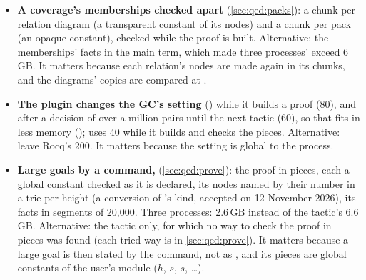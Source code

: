 \begin{itemize}
  whose applications cost the kernel time quadratic in their number. It
  matters because it is a conversion on the certificate's data.
\item \textbf{A coverage's memberships checked apart}
  (\cref{sec:qed:packs}): a chunk per relation diagram (a transparent
  constant of its nodes) and a chunk per pack (an opaque constant),
  checked while the proof is built. Alternative: the memberships' facts
  in the main term, which made three processes'  exceed
  6\,GB. It matters because each relation's nodes are made again in its
  chunks, and the diagrams' copies are compared at .
\item \textbf{The plugin changes the GC's setting} ()
  while it builds a proof (80), and after a decision of over a million
  pairs until the next tactic (60), so that  fits in less
  memory ();  uses 40 while
  it builds and checks the pieces. Alternative: leave Rocq's 200. It
  matters because the setting is global to the process.
\item \textbf{Large goals by a command, }
  (\cref{sec:qed:prove}): the proof in pieces, each a global constant
  checked as it is declared, its nodes named by their number in a trie
  per height (a conversion of 's kind, accepted on 12 November
  2026), its facts in segments of 20,000. Three processes: 2.6\,GB
  instead of the tactic's 6.6\,GB. Alternative: the tactic only, for
  which no way to check the proof in pieces was found (each tried way
  is in \cref{sec:qed:prove}). It matters because a large goal is then
  stated by the command, not as , and its pieces are global constants of the user's module
  ($h$, $s$, $s$, \dots).
\end{itemize}
